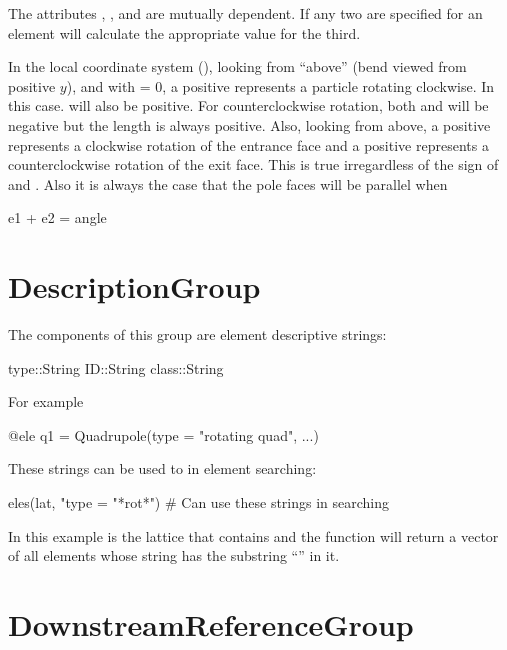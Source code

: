 
The attributes , , and  are mutually dependent. If any two are specified for
an element \accellat will calculate the appropriate value for the third.

In the local coordinate system (), looking from ``above'' (bend viewed from positive
$y$), and with  = 0, a positive  represents a particle rotating clockwise. In
this case.  will also be positive. For counterclockwise rotation, both  and 
will be negative but the length  is always positive. Also, looking from above, a positive
 represents a clockwise rotation of the entrance face and a positive  represents a
counterclockwise rotation of the exit face. This is true irregardless of the sign of  and
. Also it is always the case that the pole faces will be parallel when
\begin{example}
  e1 + e2 = angle
\end{example}

\section{DescriptionGroup}
\label{s:descrip.g}

The components of this group are element descriptive strings:
\begin{example}
  type::String 
  ID::String 
  class::String 
\end{example}
 For example
\begin{example}
  @ele q1 = Quadrupole(type = "rotating quad", ...)
\end{example}

These strings can be used to in element searching:
\begin{example}
  eles(lat, "type = "*rot*")     # Can use these strings in searching
\end{example}
In this example  is the lattice that contains  and the  function
will return a vector of all elements whose  string has the substring ``''
in it.

\section{DownstreamReferenceGroup}
\label{s:dreference.g}

